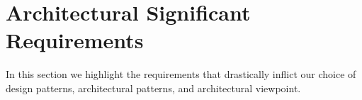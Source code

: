 \section{Architectural Significant Requirements}

In this section we highlight the requirements that drastically inflict our choice of design patterns, architectural patterns, and architectural viewpoint.

\stopreq
